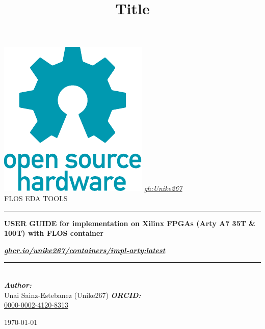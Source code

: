 
\newcommand{\gh}{\href{https://github.com/Unike267}{gh:Unike267}}
\newcommand{\type}{FLOS EDA TOOLS}
\newcommand{\titulo}{USER GUIDE for implementation on Xilinx FPGAs (Arty A7 35T \& 100T) with FLOS container} %
\title{Title}
\newcommand{\subtitle}{\textit{\href{https://github.com/Unike267/Containers/pkgs/container/containers\%2Fimpl-arty}{ghcr.io/unike267/containers/impl-arty:latest}}}

\begin{center}\leavevmode
    \normalfont
    \includegraphics[width=0.35\columnwidth]{figures/Open-source-hardware-logo.pdf}
    \vskip 10mm 
    \textit{\Large \gh}\\[1 cm]
    {\large \type}
    \vskip 5mm
    \rule{\linewidth}{0.2 mm}
    {\huge \bfseries \titulo \par}
    \vskip 5mm
    {\Large \bfseries \subtitle \par}
    \rule{\linewidth}{0.2 mm}\\[1.5 cm]
    \large
	\emph{\textbf{Author:}}\\
    Unai Sainz-Estebanez (Unike267)
    \vskip 5mm
	\emph{\textbf{ORCID:}}\\
    \href{https://orcid.org/0000-0002-4120-8313}{0000-0002-4120-8313}
    \vfill
    {\normalsize \today \par}
\end{center}
\cleardoublepage
